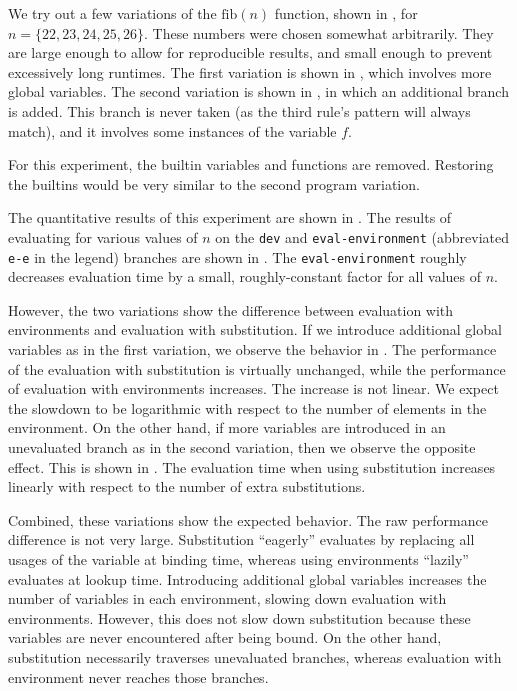 We try out a few variations of the $\text{fib}(n)$ function, shown in , for $n=\{22,23,24,25,26\}$. These numbers were chosen somewhat arbitrarily. They are large enough to allow for reproducible results, and small enough to prevent excessively long runtimes. The first variation is shown in , which involves more global variables. The second variation is shown in , in which an additional branch is added. This branch is never taken (as the third rule's pattern will always match), and it involves some instances of the variable $f$.

For this experiment, the builtin variables and functions are removed. Restoring the builtins would be very similar to the second program variation.

The quantitative results of this experiment are shown in . The results of evaluating  for various values of $n$ on the \texttt{dev} and \texttt{eval-environment} (abbreviated \texttt{e-e} in the legend) branches are shown in . The \texttt{eval-environment} roughly decreases evaluation time by a small, roughly-constant factor for all values of $n$.

However, the two variations show the difference between evaluation with environments and evaluation with substitution. If we introduce additional global variables as in the first variation, we observe the behavior in . The performance of the evaluation with substitution is virtually unchanged, while the performance of evaluation with environments increases. The increase is not linear. We expect the slowdown to be logarithmic with respect to the number of elements in the environment. On the other hand, if more variables are introduced in an unevaluated branch as in the second variation, then we observe the opposite effect. This is shown in . The evaluation time when using substitution increases linearly with respect to the number of extra substitutions.

Combined, these variations show the expected behavior. The raw performance difference is not very large. Substitution ``eagerly'' evaluates by replacing all usages of the variable at binding time, whereas using environments ``lazily'' evaluates at lookup time. Introducing additional global variables increases the number of variables in each environment, slowing down evaluation with environments. However, this does not slow down substitution because these variables are never encountered after being bound. On the other hand, substitution necessarily traverses unevaluated branches, whereas evaluation with environment never reaches those branches.

